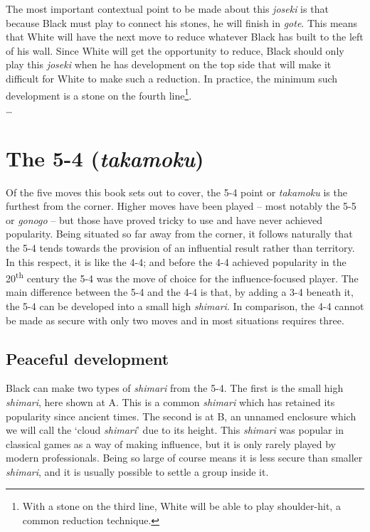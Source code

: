 \documentclass[a5paper,12pt,twoside]{book} %
\newcounter{joseki}                 %
\begin{document}
The most important contextual point to be made about this \textit{joseki} is that because Black must play{\large\blackstone[8]} to connect his stones, he will finish in \textit{gote}. This means that White will have the next move to reduce whatever Black has built to the left of his wall. Since White will get the opportunity to reduce, Black should only play this \textit{joseki} when he has development on the top side that will make it difficult for White to make such a reduction. In practice, the minimum such development is a stone on the fourth line\footnote{With a stone on the third line, White will be able to play shoulder-hit, a common reduction technique.}.\\
\ldots

\chapter{The 5-4 (\textit{takamoku}) \label{sec:5-4}}

Of the five moves this book sets out to cover, the 5-4 point or \textit{takamoku} is the furthest from the corner. Higher moves have been played – most notably the 5-5 or \textit{gonogo} – but those have proved tricky to use and have never achieved popularity. Being situated so far away from the corner, it follows naturally that the 5-4 tends towards the provision of an influential result rather than territory. In this respect, it is like the 4-4; and before the 4-4 achieved popularity in the 20\textsuperscript{th} century the 5-4 was the move of choice for the influence-focused player. The main difference between the 5-4 and the 4-4 is that, by adding a 3-4 beneath it, the 5-4 can be developed into a small high \textit{shimari}. In comparison, the 4-4 cannot be made as secure with only two moves and in most situations requires three.\\

\section{Peaceful development}

Black can make two types of \textit{shimari} from the 5-4. The first is the small high \textit{shimari}, here shown at A. This is a common \textit{shimari} which has retained its popularity since ancient times. The second is at B, an unnamed enclosure which we will call the `cloud \textit{shimari}' due to its height. This \textit{shimari} was popular in classical games as a way of making influence, but it is only rarely played by modern professionals. Being so large of course means it is less secure than smaller \textit{shimari}, and it is usually possible to settle a group inside it.\\
\end{document}
